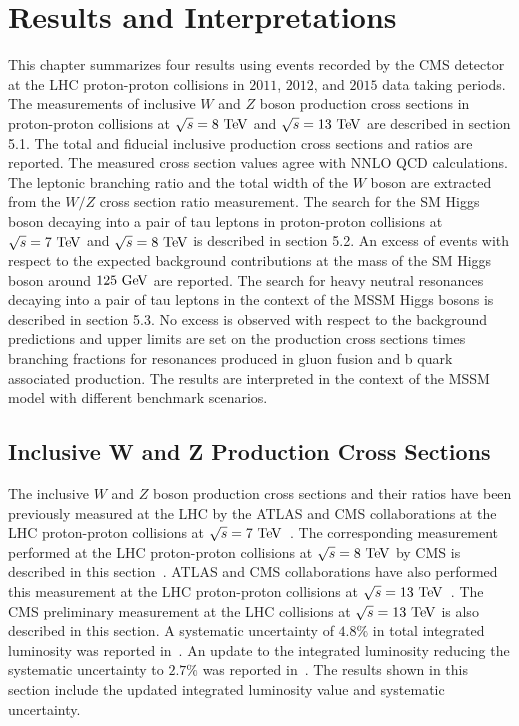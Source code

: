 \chapter{Results and Interpretations}

This chapter summarizes four results using events recorded by the CMS detector at the LHC proton-proton collisions in $2011$, $2012$, and $2015$ data taking periods. The measurements of inclusive $W$ and $Z$ boson production cross sections in proton-proton collisions at $\sqrt{s}=8~\mathrm{Te\kern -0.1em V}$ and $\sqrt{s}=13~\mathrm{Te\kern -0.1em V}$ are described in section 5.1. The total and fiducial inclusive production cross sections and ratios are reported. The measured cross section values agree with NNLO QCD calculations. The leptonic branching ratio and the total width of the $W$ boson are extracted from the $W/Z$ cross section ratio measurement. The search for the SM Higgs boson decaying into a pair of tau leptons in proton-proton collisions at $\sqrt{s}=7~\mathrm{Te\kern -0.1em V}$ and $\sqrt{s}=8~\mathrm{Te\kern -0.1em V}$ is described in section 5.2. An excess of events with respect to the expected background contributions at the mass of the SM Higgs boson around $125~\mathrm{Ge\kern -0.1em V}$ are reported. The search for heavy neutral resonances decaying into a pair of tau leptons in the context of the MSSM Higgs bosons is described in section 5.3. No excess is observed with respect to the background predictions and upper limits are set on the production cross sections times branching fractions for resonances produced in gluon fusion and b quark associated production. The results are interpreted in the context of the MSSM model with different benchmark scenarios.  
 
\section{Inclusive W and Z Production Cross Sections}

The inclusive $W$ and $Z$ boson production cross sections and their ratios have been previously measured at the LHC by the ATLAS and CMS collaborations at the LHC proton-proton collisions at $\sqrt{s}=7~\mathrm{Te\kern -0.1em V}$~\cite{CMS:2011aa,Chatrchyan:2011nv,Aad:2011dm}. The corresponding measurement performed at the LHC proton-proton collisions at $\sqrt{s}=8~\mathrm{Te\kern -0.1em V}$ by CMS is described in this section~\cite{Chatrchyan:2014mua}. ATLAS and CMS collaborations have also performed this measurement at the LHC proton-proton collisions at $\sqrt{s}=13~\mathrm{Te\kern -0.1em V}$~\cite{CMS-PAS-SMP-15-004,Aad:2016naf}. The CMS preliminary measurement at the LHC collisions at $\sqrt{s}=13~\mathrm{Te\kern -0.1em V}$ is also described in this section. A systematic uncertainty of $4.8\%$ in total integrated luminosity was reported in~\cite{CMS-PAS-SMP-15-004}. An update to the integrated luminosity  reducing the systematic uncertainty to $2.7\%$ was reported in~\cite{CMS-PAS-LUM-15-001}. The results shown in this section include the updated integrated luminosity value and systematic uncertainty.

